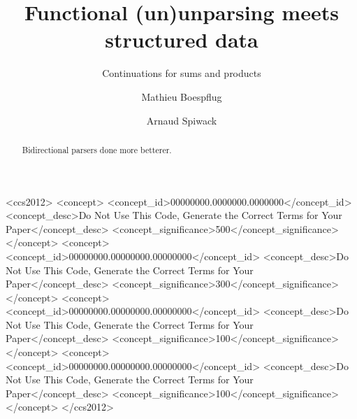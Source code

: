 \documentclass[sigplan,review,dvipsnames,screen,10pt]{acmart}
\begin{document}
\title{Functional (un)unparsing meets structured data}
\subtitle{Continuations for sums and products}

\author{Mathieu Boespflug}

\author{Arnaud Spiwack}



\begin{abstract}
  Bidirectional parsers done more betterer.
\end{abstract}

\begin{CCSXML}
<ccs2012>
 <concept>
  <concept_id>00000000.0000000.0000000</concept_id>
  <concept_desc>Do Not Use This Code, Generate the Correct Terms for Your Paper</concept_desc>
  <concept_significance>500</concept_significance>
 </concept>
 <concept>
  <concept_id>00000000.00000000.00000000</concept_id>
  <concept_desc>Do Not Use This Code, Generate the Correct Terms for Your Paper</concept_desc>
  <concept_significance>300</concept_significance>
 </concept>
 <concept>
  <concept_id>00000000.00000000.00000000</concept_id>
  <concept_desc>Do Not Use This Code, Generate the Correct Terms for Your Paper</concept_desc>
  <concept_significance>100</concept_significance>
 </concept>
 <concept>
  <concept_id>00000000.00000000.00000000</concept_id>
  <concept_desc>Do Not Use This Code, Generate the Correct Terms for Your Paper</concept_desc>
  <concept_significance>100</concept_significance>
 </concept>
</ccs2012>
\end{CCSXML}

\end{document}
